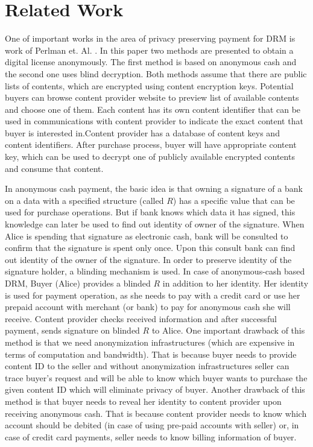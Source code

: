 \documentclass[times]{secauth}
\begin{document}
\section{Related Work}
\label{sec_related}
One of important works in the area of privacy preserving payment for DRM is work of Perlman et. Al. \cite{N28}. In this paper two methods are presented to obtain a digital license anonymously. The first method is based on anonymous cash and the second one uses blind decryption. Both methods assume that there are public lists of contents, which are encrypted using content encryption keys. Potential buyers can browse content provider website to preview list of available contents and choose one of them. Each content has its own content identifier that can be used in communications with content provider to indicate the exact content that buyer is interested in.Content provider has a database of content keys and content identifiers. After purchase process, buyer will have appropriate content key, which can be used to decrypt one of publicly available encrypted contents and consume that content. 

In anonymous cash payment, the basic idea is that owning a signature of a bank on a data with a specified structure (called $R$) has a specific value that can be used for purchase operations. But if bank knows which data it has signed, this knowledge can later be used to find out identity of owner of the signature. When Alice is spending that signature as electronic cash, bank will be consulted to confirm that the signature is spent only once. Upon this consult bank can find out identity of the owner of the signature. In order to preserve identity of the signature holder, a blinding mechanism is used. In case of anonymous-cash based DRM, Buyer (Alice) provides a blinded $R$ in addition to her identity. Her identity is used for payment operation, as she needs to pay with a credit card or use her prepaid account with merchant (or bank) to pay for anonymous cash she will receive. Content provider checks received information and after successful payment, sends signature on blinded $R$ to Alice. One important drawback of this method is that we need anonymization infrastructures (which are expensive in terms of computation and bandwidth\cite{N21}). That is because buyer needs to provide content ID to the seller and without anonymization infrastructures seller can trace buyer's request and will be able to know which buyer wants to purchase the given content ID which will eliminate privacy of buyer. Another drawback of this method is that buyer needs to reveal her identity to content provider upon receiving anonymous cash. That is because content provider needs to know which account should be debited (in case of using pre-paid accounts with seller) or, in case of credit card payments, seller needs to know billing information of buyer.
\end{document}
